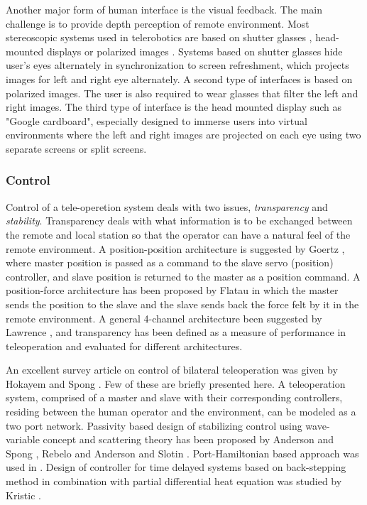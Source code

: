 Another major form of human interface is the visual feedback. The main challenge is to provide depth perception of remote environment. Most stereoscopic systems used in telerobotics are based on shutter glasses \cite{aracil1997telerobotic,matthies1992stereo}, head-mounted displays \cite{matthies1992stereo} or polarized images \cite{hirzinger1994robots}. Systems based on shutter glasses hide user's eyes alternately in synchronization to screen refreshment, which projects images for left and right eye alternately. A second type of interfaces is based on polarized images. The user is also required to wear glasses that filter the left and right images. The third type of interface is  the head mounted display such as "Google cardboard",  especially designed to immerse users into virtual environments where the left and right images are projected on each eye using two separate screens or split screens.

\subsubsection{Control}
Control of a tele-operetion system deals with two issues, \textit{transparency} and \textit{stability}. Transparency deals with what information is to be exchanged between the remote and local station so that the operator can have a natural feel of the remote environment. A position-position architecture is suggested by  Goertz \cite{goertz1961anl}, where  master position is passed as a command to the slave servo (position) controller, and slave position is returned to the master as a position command. A position-force architecture has been proposed by Flatau \cite{flatau1977sm} in which the master sends the position to the slave and the slave sends back the force felt by it in the remote environment. A general 4-channel architecture been suggested by Lawrence \cite{lawrence1993stability}, and transparency has been defined  as a measure of performance in teleoperation and evaluated for different architectures.

An excellent survey article on control of bilateral teleoperation was given by Hokayem and Spong \cite{hokayem2006bilateral}. Few of these are briefly presented here. A teleoperation system, comprised of a master and slave with their corresponding controllers, residing between the human operator and the environment,   can be modeled as a two port network. Passivity based design of stabilizing control using  wave-variable concept and scattering theory has been proposed by Anderson and Spong \cite{anderson1989bilateral}, Rebelo \cite{rebelo2015time} and Anderson and Slotin \cite{niemeyer1991stable}.   Port-Hamiltonian  based approach was used in \cite{stramigioli2010novel,stramigioli2005sampled}. Design of controller for time delayed systems  based on back-stepping method in combination with partial differential heat  equation was studied by  Kristic \cite{krstic2009delay}. 



